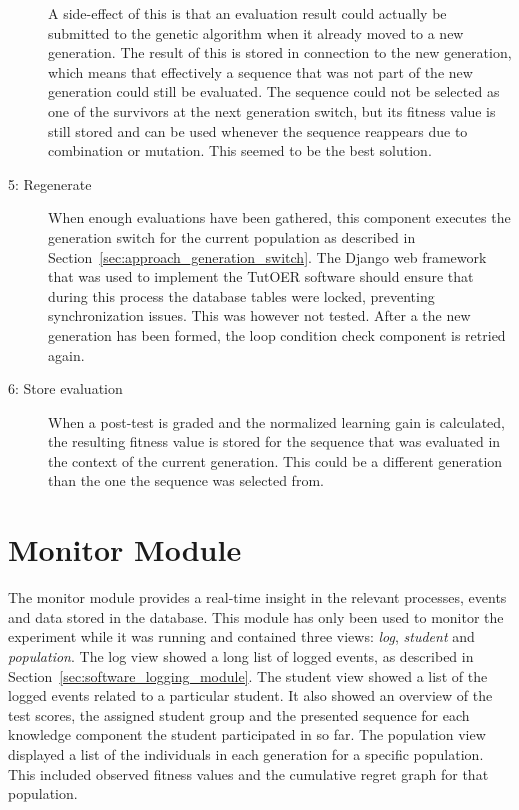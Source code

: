 \begin{description}
		A side-effect of this is that an evaluation result could actually
		be submitted to the genetic algorithm when it already moved to a new
		generation. The result of this is stored in connection to the new
		generation, which means that effectively a sequence that was not part
		of the new generation could still be evaluated. The sequence could not
		be selected as one of the survivors at the next generation switch, but
		its fitness value is still stored and can be used whenever the sequence
		reappears due to combination or mutation. This seemed to be the best
		solution.
	\item[5: Regenerate] When enough evaluations have been gathered, this
		component executes the generation switch for the current population as
		described in Section~\ref{sec:approach_generation_switch}. The Django
		web framework that was used to implement the TutOER software should
		ensure that during this process the database tables were locked,
		preventing synchronization issues. This was however not tested. After a
		the new generation has been formed, the loop condition check component
		is retried again.
	\item[6: Store evaluation] When a post-test is graded and the normalized
		learning gain is calculated, the resulting fitness value is stored for
		the sequence that was evaluated in the context of the current
		generation. This could be a different generation than the one the
		sequence was selected from.
\end{description}
\section{Monitor Module}
\label{sec:software_monitor_module}
The monitor module provides a real-time insight in the relevant processes,
events and data stored in the database. This module has only been used to
monitor the experiment while it was running and contained three views:
\emph{log}, \emph{student} and \emph{population}. The log view showed a long
list of logged events, as described in Section~\ref{sec:software_logging_module}.
The student view showed a list of the logged events related to a particular
student. It also showed an overview of the test scores, the assigned student
group and the presented sequence for each knowledge component the student
participated in so far. The population view displayed a list of the individuals
in each generation for a specific population. This included observed fitness
values and the cumulative regret graph for that population.
